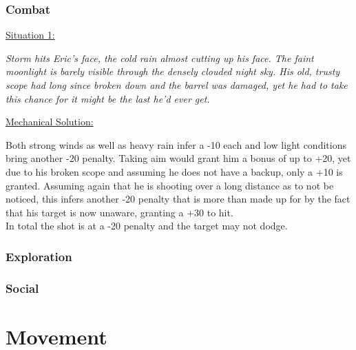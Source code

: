 \documentclass[12pt,a4paper]{book}
\begin{document}
	\subsection*{Combat}
	\underline{Situation 1:}\par
	\hfill\begin{minipage}{\dimexpr\textwidth-1cm}
		\textit{Storm hits Eric’s face, the cold rain almost cutting up his face. The faint moonlight is barely visible through the densely clouded night sky. His old, trusty scope had long since broken down and the barrel was damaged, yet he had to take this chance for it might be the last he’d ever get.}
	\end{minipage}

	\underline{Mechanical Solution:}\par
	\hfill\begin{minipage}{\dimexpr\textwidth-2.5cm}
		Both strong winds as well as heavy rain infer a -10 each and low light conditions bring another -20 penalty. Taking aim would grant him a bonus of up to +20, yet due to his broken scope and assuming he does not have a backup, only a +10 is granted. Assuming again that he is shooting over a long distance as to not be noticed, this infers another -20 penalty that is more than made up for by the fact that his target is now unaware, granting a +30 to hit.\\
		In total the shot is at a -20 penalty and the target may not dodge.
	\end{minipage}
	
	\subsection*{Exploration}
	\subsection*{Social}
	
	\chapter{Movement}
\end{document}
